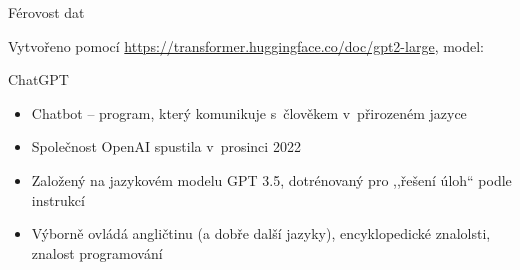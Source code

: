 \documentclass[aspectratio=169,dvipsnames]{beamer}
\begin{document}
\begin{frame}{Férovost dat}

    \begin{center}


    \end{center}

    \centering




    {\tiny Vytvořeno pomocí \url{https://transformer.huggingface.co/doc/gpt2-large}, model: \citet{radford2019language}}


\end{frame}


\begin{frame}{ChatGPT}

    \begin{itemize}[<+->]

        \item Chatbot -- program, který komunikuje s~člověkem v~přirozeném jazyce

        \item Společnost OpenAI spustila v~prosinci 2022

        \item Založený na jazykovém modelu GPT 3.5, dotrénovaný pro ,,řešení
            úloh`` podle instrukcí

        \item Výborně ovládá angličtinu (a dobře další jazyky), encyklopedické
            znalolsti, znalost programování

    \end{itemize}

\end{frame}
\end{document}
